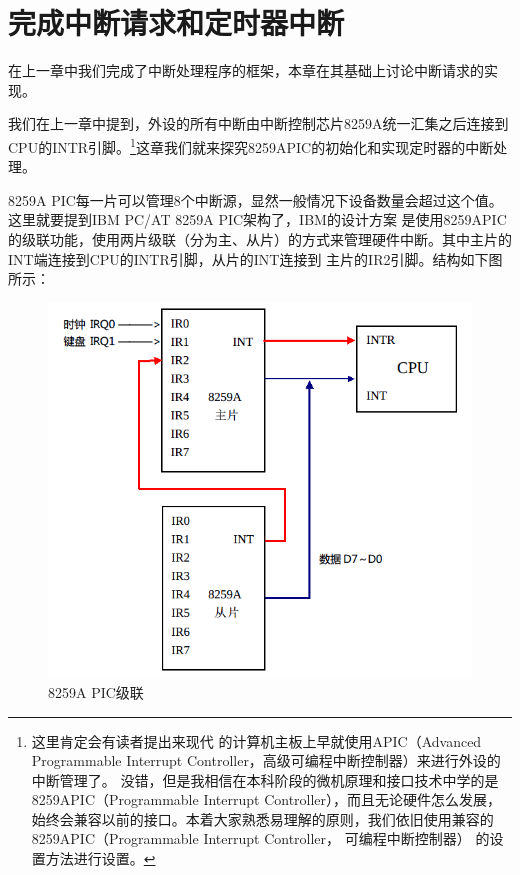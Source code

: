 
\section {完成中断请求和定时器中断}

\par 在上一章中我们完成了中断处理程序的框架，本章在其基础上讨论中断请求的实现。

\par 我们在上一章中提到，外设的所有中断由中断控制芯片8259A统一汇集之后连接到CPU的INTR引脚。\footnote{这里肯定会有读者提出来现代\allowbreak
的计算机主板上早就使用APIC（Advanced Programmable Interrupt Controller，高级可编程中断控制器）来进行外设的中断管理了。\allowbreak
没错，但是我相信在本科阶段的微机原理和接口技术中学的是8259APIC（Programmable Interrupt Controller），而且无论硬件怎么发展，\allowbreak
始终会兼容以前的接口。本着大家熟悉易理解的原则，我们依旧使用兼容的8259APIC（Programmable Interrupt Controller， 可编程中断控制器）\allowbreak
的设置方法进行设置。}这章我们就来探究8259APIC的初始化和实现定时器的中断处理。

\par 8259A PIC每一片可以管理8个中断源，显然一般情况下设备数量会超过这个值。这里就要提到IBM PC/AT 8259A PIC架构了，IBM的设计方案\allowbreak
是使用8259APIC的级联功能，使用两片级联（分为主、从片）的方式来管理硬件中断。其中主片的INT端连接到CPU的INTR引脚，从片的INT连接到\allowbreak
主片的IR2引脚。结构如下图所示：
\begin{figure}[H]
      \centering
      \includegraphics[scale=0.5]{picture/chapt8/8259A_PIC.png}
      \caption{8259A PIC级联}
\end{figure}

